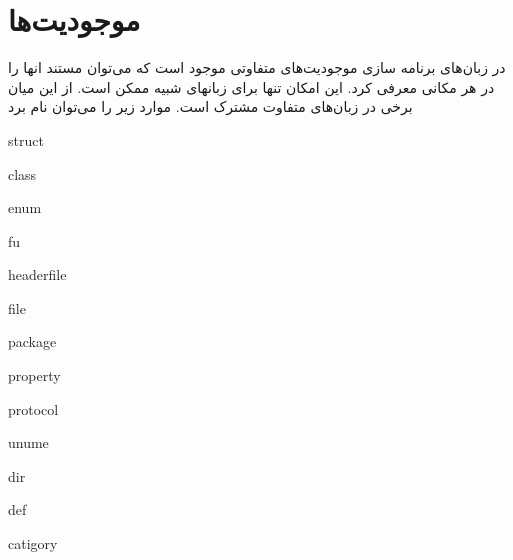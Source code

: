 

\section{موجودیت‌ها}

در زبان‌های برنامه سازی موجودیت‌های متفاوتی موجود است که می‌توان مستند انها را
در هر مکانی معرفی کرد. این امکان تنها برای زبانهای شبیه  ممکن است. از
این میان برخی در زبان‌های متفاوت مشترک است. موارد زیر را می‌توان نام برد


struct

class

enum

fu

headerfile

file

package

property

protocol

unume

dir

def

catigory


